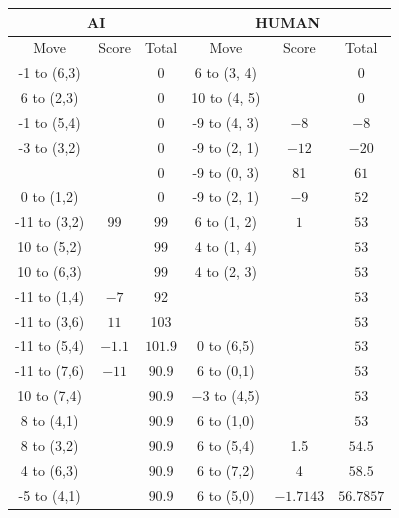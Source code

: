 \begin{appendices}
\begin{table}[H]
    \centering
    \begin{tabular}{cccccc}
        \hline
        \multicolumn{3}{c}{AI}        & \multicolumn{3}{c}{HUMAN}     \\ \hline
        Move         & Score & Total & Move          & Score & Total \\ \hline
          -1 to (6,3) &     &  0    &   6 to (3, 4) &      &  0    \\ \hline
          6 to (2,3) &     &  0    &   10 to (4, 5) &      &  0    \\ \hline
          -1 to (5,4) &     &  0    &   -9 to (4, 3) & $-8$   &  $-8$    \\ \hline
          -3 to (3,2) &     &  0    &   -9 to (2, 1) & $-12$   &  $-20$    \\ \hline
                      &     &  0    &   -9 to (0, 3) & 81   &  $61$    \\ \hline
          0 to (1,2) &      &  0    &   -9 to (2, 1) & $-9$   &  $52$    \\ \hline
          -11 to (3,2) &  99 &  99    & 6 to (1, 2) & $1$   &  $53$    \\ \hline
          10 to (5,2) &   &  99       & 4 to (1, 4) &    &  $53$    \\ \hline
          10 to (6,3) &   &  99       & 4 to (2, 3) &    &  $53$    \\ \hline
          -11 to (1,4) & $-7$   &  92  &            &    &  $53$    \\ \hline
          -11 to (3,6) & $11$   &  103  &            &    &  $53$    \\ \hline
          -11 to (5,4) & $-1.1$   &  $101.9$  & 0 to (6,5)      &    &  $53$    \\ \hline
          -11 to (7,6) & $-11$   &  $90.9$  & 6 to (0,1)      &    &  $53$    \\ \hline
          10 to (7,4) &    &  $90.9$  & $-3$ to (4,5)      &    &  $53$    \\ \hline
          8 to (4,1) &    &  $90.9$  & $6$ to (1,0)      &    &  $53$    \\ \hline
          8 to (3,2) &    &  $90.9$  & $6$ to (5,4)      & 1.5    &  $54.5$    \\ \hline
          4 to (6,3) &    &  $90.9$  & $6$ to (7,2)      & 4    &  $58.5$    \\ \hline
          -5 to (4,1) &    &  $90.9$  & $6$ to (5,0)      & $-1.7143$  &  $56.7857$    \\ \hline

\end{tabular}
\end{table}
\end{appendices}
